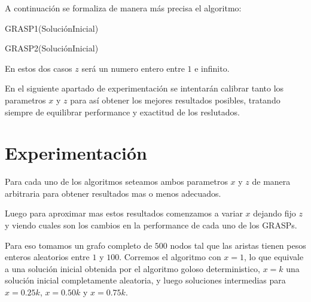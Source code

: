 A continuación se formaliza de manera más precisa el algoritmo:

\begin{algorithm}
  	\begin{algorithmic}[1]\parskip=1mm
		 \caption{ GRASP1(SoluciónInicial) }
	\end{algorithmic}
\end{algorithm}

\begin{algorithm}
  	\begin{algorithmic}[1]\parskip=1mm
		 \caption{ GRASP2(SoluciónInicial) }
	\end{algorithmic}
\end{algorithm}

En estos dos casos $z$ será un numero entero entre $1$ e infinito.

En el siguiente apartado de experimentación se intentarán calibrar tanto los parametros $x$ y $z$ para así obtener los mejores resultados posibles, tratando siempre de equilibrar performance y exactitud de los reslutados.

\section{Experimentación}

Para cada uno de los algoritmos seteamos ambos parametros $x$ y $z$ de manera arbitraria para obtener resultados mas o menos adecuados.

Luego para aproximar mas estos resultados comenzamos a variar $x$ dejando fijo $z$ y viendo cuales son los cambios en la performance de cada uno de los GRASPs.

Para eso tomamos un grafo completo de $500$ nodos tal que las aristas tienen pesos enteros aleatorios entre $1$ y $100$. Corremos el algoritmo con $x=1$, lo que equivale a una solución inicial obtenida por el algoritmo goloso deterministico, $x=k$ una solución inicial completamente aleatoria, y luego soluciones intermedias para $x = 0.25 k$, $x = 0.50k$ y $x = 0.75 k$.

